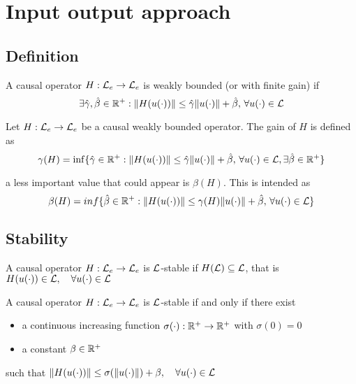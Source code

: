 \chapter{Input output approach}

\section{Definition}

\begin{definition}
	A causal operator $H : \mathcal{L}_e \to \mathcal{L}_e$ is weakly bounded (or with finite gain) if
	\[
		\exists \hat\gamma, \hat\beta \in \mathbb{R}^+ : \lVert H(u(\cdot))\rVert \leq \hat\gamma \lVert u(\cdot)\rVert + \hat\beta, \, \forall u(\cdot) \in \mathcal{L}
	\]
\end{definition}

\begin{definition}
	Let $H : \mathcal{L}_e \to \mathcal{L}_e$ be a causal weakly bounded operator.
	The gain of $H$ is defined as
	\[
		\gamma(H) = \inf\{\hat\gamma \in \mathbb{R}^+ : \lVert H(u(\cdot))\rVert \leq \hat\gamma \lVert u(\cdot)\rVert + \hat\beta, \, \forall u(\cdot) \in \mathcal{L}, \exists \hat\beta \in \mathbb{R}^+\}
	\]
\end{definition}

\begin{nb}a less important value that could appear is $\beta(H)$.
This is intended as
\[
	\beta(H) = inf\{\hat\beta \in \mathbb{R}^+ : \lVert H(u(\cdot))\rVert \leq \gamma(H) \lVert u(\cdot)\rVert + \hat\beta, \, \forall u(\cdot) \in \mathcal{L}\}
\]
\end{nb}

\section{Stability}

\begin{definition}
	A causal operator $H : \mathcal{L}_e \to \mathcal{L}_e$ is $\mathcal{L}$-stable if $H(\mathcal{L}) \subseteq \mathcal{L}$, that is $H(u(\cdot)) \in \mathcal{L}, \quad \forall u(\cdot) \in \mathcal{L}$
\end{definition}

\begin{theorem}
	A causal operator $H : \mathcal{L}_e \to \mathcal{L}_e$ is $\mathcal{L}$-stable if and only if there exist
	\begin{itemize}
		\item a continuous increasing function $\sigma(\cdot): \mathbb{R}^+ \to \mathbb{R}^+$ with $\sigma(0) = 0$
		\item a constant $\beta \in \mathbb{R}^+$
	\end{itemize}
	such that $\lVert H(u(\cdot))\rVert \leq \sigma(\lVert u(\cdot)\rVert) + \beta, \quad \forall u(\cdot) \in \mathcal{L}$
\end{theorem}

